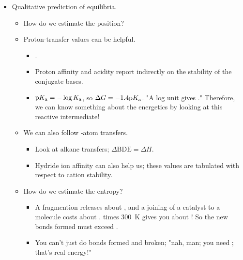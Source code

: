 \documentclass[../notes.tex]{subfiles}
\begin{document}
\begin{itemize}
\begin{itemize}
    \end{itemize}
    \item Qualitative prediction of equilibria.
    \begin{itemize}
        \item How do we estimate the position?
        \item Proton-transfer values can be helpful.
        \begin{itemize}
            \item {}.
            \item Proton affinity and acidity report indirectly on the stability of the conjugate bases.
            \item $\textup{p}K_\textup{a}=-\log K_\textup{a}$, so $\Delta G=-1.4\textup{p}K_\textup{a}$. "A log unit gives ." Therefore, we can know something about the energetics by looking at this reactive intermediate!
        \end{itemize}
        \item We can also follow -atom transfers.
        \begin{itemize}
            \item Look at alkane transfers; $\Delta\text{BDE}=\Delta H$.
            \item Hydride ion affinity can also help us; these values are tabulated with respect to cation stability.
        \end{itemize}
        \item How do we estimate the entropy?
        \begin{itemize}
            \item A fragmention releases about , and a joining of a catalyst to a molecule costs about .  times \SI{300}{\kelvin} gives you about ! So the new bonds formed must exceed .
            \item You can't just do bonds formed and broken; "nah, man; you need ; that's real energy!"
        \end{itemize}
    \end{itemize}
\end{itemize}
\end{document}
